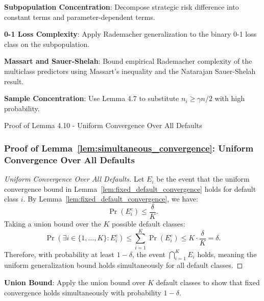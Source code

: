 \begin{guideblock}
\item \textbf{Subpopulation Concentration}: Decompose strategic risk difference into constant terms and parameter-dependent terms.
\item \textbf{0-1 Loss Complexity}: Apply Rademacher generalization to the binary 0-1 loss class on the subpopulation.
\item \textbf{Massart and Sauer-Shelah}: Bound empirical Rademacher complexity of the multiclass predictors using Massart's inequality and the Natarajan Sauer-Shelah result.
\item \textbf{Sample Concentration}: Use Lemma 4.7 to substitute $n_i \ge \gamma n / 2$ with high probability.
\end{guideblock}


\begin{sourceblock}{Proof of Lemma 4.10 - Uniform Convergence Over All Defaults}
\subsubsection*{Proof of Lemma~\ref{lem:simultaneous_convergence}: Uniform Convergence Over All Defaults}
\label{app:proof_simultaneous_convergence}
\begin{proof}[Uniform Convergence Over All Defaults]
Let $E_i$ be the event that the uniform convergence bound in Lemma~\ref{lem:fixed_default_convergence} holds for default class $i$. By Lemma~\ref{lem:fixed_default_convergence}, we have:
\begin{equation}
    \Pr(E_i^c) \le \frac{\delta}{K}.
\end{equation}
Taking a union bound over the $K$ possible default classes:
\begin{equation}
    \Pr\left( \exists i \in \{1, \dots, K\} : E_i^c \right) \le \sum_{i=1}^K \Pr(E_i^c) \le K \cdot \frac{\delta}{K} = \delta.
\end{equation}
Therefore, with probability at least $1 - \delta$, the event $\bigcap_{i=1}^K E_i$ holds, meaning the uniform generalization bound holds simultaneously for all default classes.
\end{proof}
\end{sourceblock}

\begin{guideblock}
\item \textbf{Union Bound}: Apply the union bound over $K$ default classes to show that fixed convergence holds simultaneously with probability $1-\delta$.
\end{guideblock}


